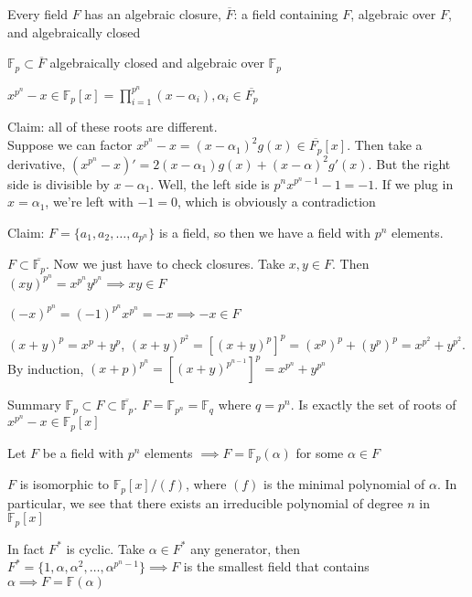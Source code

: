 \documentclass[10pt]{article}
\newcommand{\F}{\mathbb{F}}
\begin{document}
\begin{thm}
    Every field $F$ has an algebraic closure, $\overline{F}$: a field containing $F$, algebraic over $F$, and algebraically closed
\end{thm}

\begin{cor}
    $\F_p \subset \overline{F}$ algebraically closed and algebraic over $\F_p$
\end{cor}

$x^{p^n} - x \in \F_p[x] = \prod\limits_{i = 1}^{p^n}(x - \alpha_i), \alpha_i \in \overline{F_p}$

Claim: all of these roots are different.\\
Suppose we can factor $x^{p^n} - x = (x - \alpha_1)^2g(x) \in \overline{F_p}[x]$. Then take a derivative, $(x^{p^n} - x)' = 2(x - \alpha_1)g(x) + (x -\alpha)^2g'(x)$. But the right side is divisible by $x-\alpha_1$. Well, the left side is $p^nx^{p^n - 1} - 1 = -1$. If we plug in $x = \alpha_1$, we're left with $-1 = 0$, which is obviously a contradiction

Claim: $F = \{a_1, a_2, \ldots, a_{p^n}\}$ is a field, so then we have a field with $p^n$ elements.

$F \subset \overline{\F_p}$. Now we just have to check closures. Take $x, y \in F$. Then $(xy)^{p^n} = x^{p^n}y^{p^n} \implies xy \in F$

$(-x)^{p^n} = (-1)^{p^n}x^{p^n} = -x \implies -x \in F$

$(x + y)^p = x^p + y^p$, $(x + y)^{p^2} = [(x + y)^p]^p = (x^p)^p + (y^p)^p = x^{p^2} + y^{p^2}$. By induction, $(x + p)^{p^n} = [(x + y)^{p^{n-1}}]^p = x^{p^n} + y^{p^n}$

Summary $\F_p \subset F \subset \overline{\F_p}$. $F = \F_{p^n} = \F_q$ where $q = p^n$. Is exactly the set of roots of $x^{p^n} - x \in \F_p[x]$

\begin{thm}
    Let $F$ be a field with $p^n$ elements $\implies F = \F_p(\alpha)$ for some $\alpha \in F$
\end{thm}

\begin{cor}
    $F$ is isomorphic to $\F_p[x]/(f)$, where $(f)$ is the minimal polynomial of $\alpha$. In particular, we see that there exists an irreducible polynomial of degree $n$ in $\F_p[x]$
\end{cor}

In fact $F^*$ is cyclic. Take $\alpha \in F^*$ any generator, then $F^* = \{1, \alpha, \alpha^2, \ldots, \alpha^{p^n - 1}\} \implies F$ is the smallest field that contains $\alpha \implies F = \F(\alpha)$
\end{document}
